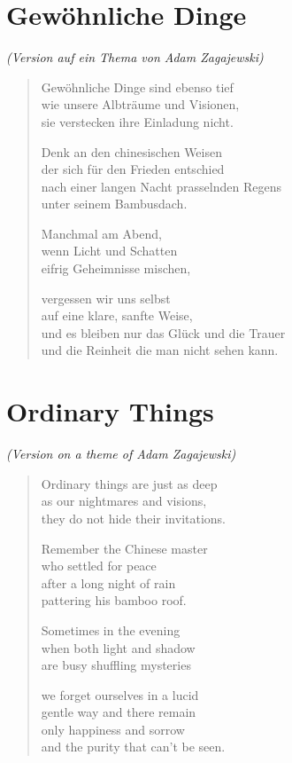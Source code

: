 
\cleartoverso

\section{Gewöhnliche Dinge}

{\smaller\emph{(Version auf ein Thema von Adam Zagajewski)}}

\begin{verse}

Gewöhnliche Dinge sind ebenso tief\\
wie unsere Albträume und Visionen,\\
sie verstecken ihre Einladung nicht.

Denk an den chinesischen Weisen\\
der sich für den Frieden entschied\\
nach einer langen Nacht prasselnden Regens\\
unter seinem Bambusdach.

Manchmal am Abend,\\
wenn Licht und Schatten\\
eifrig Geheimnisse mischen,

vergessen wir uns selbst\\
auf eine klare, sanfte Weise,\\
und es bleiben nur das Glück und die Trauer\\
und die Reinheit die man nicht sehen kann.

\end{verse}

\clearpage

\section{Ordinary Things}

{\smaller\emph{(Version on a theme of Adam Zagajewski)}}

\begin{verse}

Ordinary things are just as deep\\
as our nightmares and visions,\\
they do not hide their invitations.

Remember the Chinese master\\
who settled for peace\\
after a long night of rain\\
pattering his bamboo roof.

Sometimes in the evening\\
when both light and shadow\\
are busy shuffling mysteries

we forget ourselves in a lucid\\
gentle way and there remain\\
only happiness and sorrow\\
and the purity that can't be seen.

\end{verse}
